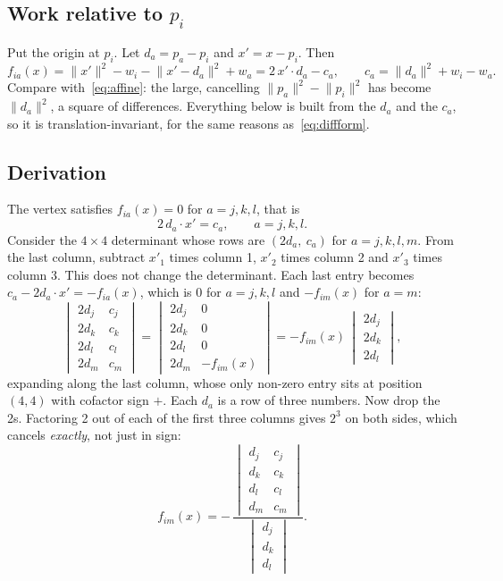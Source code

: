 \documentclass[11pt,a4paper]{article}
\newcommand{\norm}[1]{\lVert #1\rVert}
\theoremstyle{remark}
\begin{document}
\subsection{Work relative to \texorpdfstring{$p_i$}{p\_i}}

Put the origin at $p_i$. Let $d_a = p_a - p_i$ and $x' = x - p_i$. Then
\[
  f_{ia}(x) = \norm{x'}^2 - w_i - \norm{x' - d_a}^2 + w_a = 2\,x'\cdot d_a - c_a,
  \qquad
  \boxed{c_a = \norm{d_a}^2 + w_i - w_a.}
\]
Compare with~\eqref{eq:affine}: the large, cancelling $\norm{p_a}^2 - \norm{p_i}^2$ has become
$\norm{d_a}^2$, a square of differences. Everything below is built from the $d_a$ and the
$c_a$, so it is translation-invariant, for the same reasons as~\eqref{eq:diffform}.

\subsection{Derivation}

The vertex satisfies $f_{ia}(x) = 0$ for $a = j, k, l$, that is
\[
  2\,d_a\cdot x' = c_a, \qquad a = j, k, l.
\]
Consider the $4\times4$ determinant whose rows are $(2d_a,\ c_a)$ for $a = j, k, l, m$. From
the last column, subtract $x'_1$ times column 1, $x'_2$ times column 2 and $x'_3$ times
column 3. This does not change the determinant. Each last entry becomes
$c_a - 2d_a\cdot x' = -f_{ia}(x)$, which is $0$ for $a = j, k, l$ and $-f_{im}(x)$ for $a = m$:
\[
  \begin{vmatrix} 2d_j & c_j \\ 2d_k & c_k \\ 2d_l & c_l \\ 2d_m & c_m \end{vmatrix}
  =
  \begin{vmatrix} 2d_j & 0 \\ 2d_k & 0 \\ 2d_l & 0 \\ 2d_m & -f_{im}(x) \end{vmatrix}
  = -f_{im}(x)\,\begin{vmatrix} 2d_j \\ 2d_k \\ 2d_l \end{vmatrix},
\]
expanding along the last column, whose only non-zero entry sits at position $(4,4)$ with
cofactor sign $+$. Each $d_a$ is a row of three numbers. Now drop the 2s. Factoring 2 out of
each of the first three columns gives $2^3$ on both sides, which cancels \emph{exactly}, not
just in sign:
\begin{equation}\label{eq:side4}
  f_{im}(x) = -\,\frac{\begin{vmatrix} d_j & c_j \\ d_k & c_k \\ d_l & c_l \\ d_m & c_m \end{vmatrix}}
                      {\begin{vmatrix} d_j \\ d_k \\ d_l \end{vmatrix}} .
\end{equation}
\end{document}
